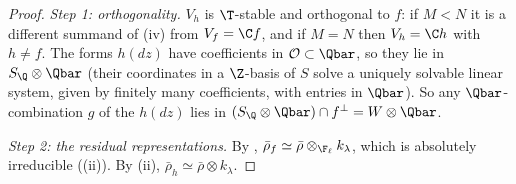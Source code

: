 \begin{proof}
\emph{Step 1: orthogonality.} $V_h$ is $\T$-stable and orthogonal to $f$: if $M<N$ it is a different summand of (iv) from $V_f=\C f$, and
if $M=N$ then $V_h=\C h$ with $h\ne f$. The forms $h(dz)$ have coefficients in $\mathcal{O}\subset\Qbar$, so they lie in $S_\Q\otimes\Qbar$ (their coordinates in a $\Z$-basis of $S$ solve a
uniquely solvable linear system, given by finitely many coefficients, with entries in $\Qbar$). So any $\Qbar$-combination $g$ of the $h(dz)$ lies in $(S_\Q\otimes\Qbar)\cap f^\perp=W\otimes\Qbar$.

\emph{Step 2: the residual representations.} By , $\bar\rho_f\simeq\bar\rho\otimes_{\F_\ell}k_\lambda$, which is absolutely irreducible
((ii)). By (ii), $\bar\rho_h\simeq\bar\rho\otimes k_\lambda$.


\end{proof}
